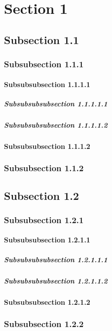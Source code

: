 \documentclass{article}
\begin{document}
\section{Section 1}

\subsection{Subsection 1.1}

\subsubsection{Subsubsection 1.1.1}

\paragraph{Subsubsubsection 1.1.1.1}

\subparagraph{Subsubsubsubsection 1.1.1.1.1}

\subparagraph{Subsubsubsubsection 1.1.1.1.2}

\paragraph{Subsubsubsection 1.1.1.2}

\subsubsection{Subsubsection 1.1.2}

\subsection{Subsection 1.2}

\subsubsection{Subsubsection 1.2.1}

\paragraph{Subsubsubsection 1.2.1.1}

\subparagraph{Subsubsubsubsection 1.2.1.1.1}

\subparagraph{Subsubsubsubsection 1.2.1.1.2}

\paragraph{Subsubsubsection 1.2.1.2}

\subsubsection{Subsubsection 1.2.2}
\end{document}

